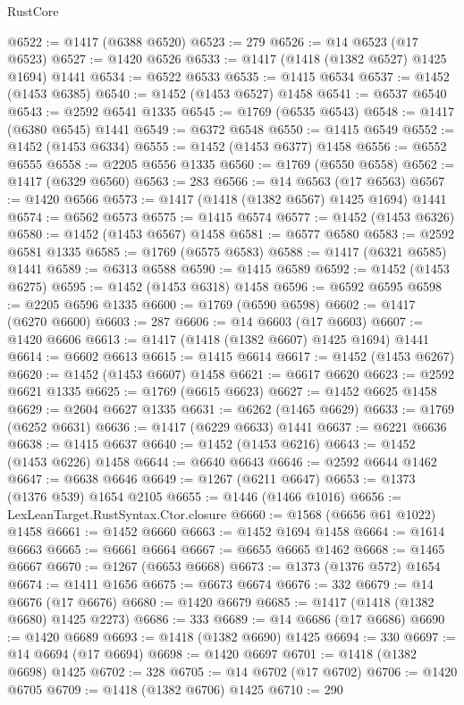 \begin{lexlean}{RustCore}
\begin{coremodule}
@6522 := @1417 (@6388 @6520)
@6523 := 279
@6526 := @14 @6523 (@17 @6523)
@6527 := @1420 @6526
@6533 := @1417 (@1418 (@1382 @6527) @1425 @1694) @1441
@6534 := @6522 @6533
@6535 := @1415 @6534
@6537 := @1452 (@1453 @6385)
@6540 := @1452 (@1453 @6527) @1458
@6541 := @6537 @6540
@6543 := @2592 @6541 @1335
@6545 := @1769 (@6535 @6543)
@6548 := @1417 (@6380 @6545) @1441
@6549 := @6372 @6548
@6550 := @1415 @6549
@6552 := @1452 (@1453 @6334)
@6555 := @1452 (@1453 @6377) @1458
@6556 := @6552 @6555
@6558 := @2205 @6556 @1335
@6560 := @1769 (@6550 @6558)
@6562 := @1417 (@6329 @6560)
@6563 := 283
@6566 := @14 @6563 (@17 @6563)
@6567 := @1420 @6566
@6573 := @1417 (@1418 (@1382 @6567) @1425 @1694) @1441
@6574 := @6562 @6573
@6575 := @1415 @6574
@6577 := @1452 (@1453 @6326)
@6580 := @1452 (@1453 @6567) @1458
@6581 := @6577 @6580
@6583 := @2592 @6581 @1335
@6585 := @1769 (@6575 @6583)
@6588 := @1417 (@6321 @6585) @1441
@6589 := @6313 @6588
@6590 := @1415 @6589
@6592 := @1452 (@1453 @6275)
@6595 := @1452 (@1453 @6318) @1458
@6596 := @6592 @6595
@6598 := @2205 @6596 @1335
@6600 := @1769 (@6590 @6598)
@6602 := @1417 (@6270 @6600)
@6603 := 287
@6606 := @14 @6603 (@17 @6603)
@6607 := @1420 @6606
@6613 := @1417 (@1418 (@1382 @6607) @1425 @1694) @1441
@6614 := @6602 @6613
@6615 := @1415 @6614
@6617 := @1452 (@1453 @6267)
@6620 := @1452 (@1453 @6607) @1458
@6621 := @6617 @6620
@6623 := @2592 @6621 @1335
@6625 := @1769 (@6615 @6623)
@6627 := @1452 @6625 @1458
@6629 := @2604 @6627 @1335
@6631 := @6262 (@1465 @6629)
@6633 := @1769 (@6252 @6631)
@6636 := @1417 (@6229 @6633) @1441
@6637 := @6221 @6636
@6638 := @1415 @6637
@6640 := @1452 (@1453 @6216)
@6643 := @1452 (@1453 @6226) @1458
@6644 := @6640 @6643
@6646 := @2592 @6644 @1462
@6647 := @6638 @6646
@6649 := @1267 (@6211 @6647)
@6653 := @1373 (@1376 @539) @1654 @2105
@6655 := @1446 (@1466 @1016)
@6656 := LexLeanTarget.RustSyntax.Ctor.closure
@6660 := @1568 (@6656 @61 @1022) @1458
@6661 := @1452 @6660
@6663 := @1452 @1694 @1458
@6664 := @1614 @6663
@6665 := @6661 @6664
@6667 := @6655 @6665 @1462
@6668 := @1465 @6667
@6670 := @1267 (@6653 @6668)
@6673 := @1373 (@1376 @572) @1654
@6674 := @1411 @1656
@6675 := @6673 @6674
@6676 := 332
@6679 := @14 @6676 (@17 @6676)
@6680 := @1420 @6679
@6685 := @1417 (@1418 (@1382 @6680) @1425 @2273)
@6686 := 333
@6689 := @14 @6686 (@17 @6686)
@6690 := @1420 @6689
@6693 := @1418 (@1382 @6690) @1425
@6694 := 330
@6697 := @14 @6694 (@17 @6694)
@6698 := @1420 @6697
@6701 := @1418 (@1382 @6698) @1425
@6702 := 328
@6705 := @14 @6702 (@17 @6702)
@6706 := @1420 @6705
@6709 := @1418 (@1382 @6706) @1425
@6710 := 290

\end{coremodule}
\end{lexlean}
